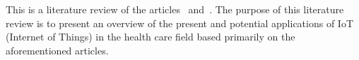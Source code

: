 This is a literature review of the articles~\cite{Bui2011}
and~\cite{Islam2015}. The purpose of this literature review is to present an
overview of the present and potential applications of IoT (Internet of Things)
in the health care field based primarily on the aforementioned articles.

